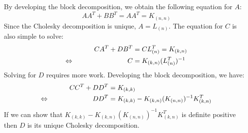By developing the block decomposition, we obtain the following equation for $A$:
\begin{equation*}
	A A^T + B B^T = A A^T = K_{(n,n)}
\end{equation*}
Since the Cholesky decomposition is unique, $A = L_{(n)}$. The equation for $C$ is also simple to solve:
\begin{alignat*}{2}
	&&C A^T + D B^T &= C L_{(n)}^T = K_{(k,n)} \\
	\Leftrightarrow\mkern40mu
	&&C &= K_{(k,n)} (L_{(n)}^T)^{-1}
\end{alignat*}
Solving for $D$ requires more work. Developing the block decomposition, we have:
\begin{alignat*}{2}
	&&C C^T + D D^T &= K_{(k,k)} \\
	\Leftrightarrow\mkern40mu
	&&D D^T &= K_{(k,k)} - K_{(k,n)} (K_{(n,n)})^{-1} K_{(k,n)}^T
\end{alignat*}
If we can show that $K_{(k,k)} - K_{(k,n)} (K_{(n,n)})^{-1} K_{(k,n)}^T$ is definite positive then $D$ is its unique Cholesky decomposition.

